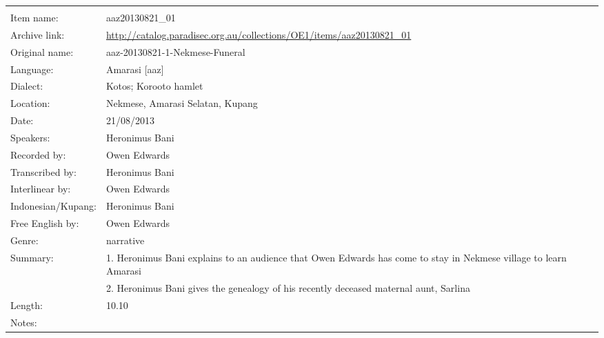 \newpage
\noindent
\wg\begin{tabular}{lL{.67\textwidth}}
			& \\
Item name:			& aaz20130821{\_}01\\
Archive link:			& \url{http://catalog.paradisec.org.au/collections/OE1/items/aaz20130821_01}\\
Original name:			& aaz-20130821-1-Nekmese-Funeral\\
Language:				& Amarasi [aaz] \\
Dialect:				& Kotos; Koro{\Q}oto hamlet \\
Location:				& Nekmese{\Q}, Amarasi Selatan, Kupang \\
Date:				& 21/08/2013\\
Speakers:				& Heronimus Bani\\
Recorded by:			& Owen Edwards\\
Transcribed by:		& Heronimus Bani\\
Interlinear by:		& Owen Edwards \\
Indonesian/Kupang:		& Heronimus Bani\\
Free English by:		& Owen Edwards\\
Genre:				& narrative\\
Summary:				& 1. Heronimus Bani explains to an audience that Owen Edwards
						has come to stay in Nekmese{\Q} village to learn Amarasi\\
					& 2. Heronimus Bani gives the genealogy of his recently deceased maternal aunt, Sarlina\\
Length:				& 10.10\\
Notes:				& \\
\end{tabular}

